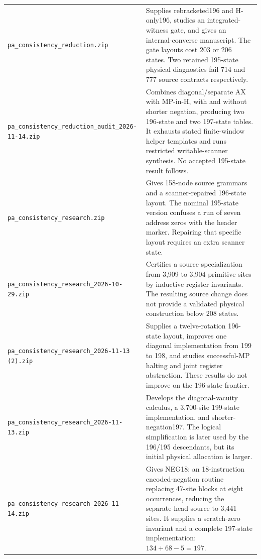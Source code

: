 \begin{longtable}{@{}>{\raggedright\arraybackslash}p{}@{\hspace{.035\textwidth}}>{\raggedright\arraybackslash}p{}@{}}
\nolinkurl{pa_consistency_reduction.zip}
& Supplies rebracketed196 and H-only196, studies an integrated-witness gate,
and gives an internal-converse manuscript. The gate layouts cost 203 or 206
states. Two retained 195-state physical diagnostics fail 714 and 777 source
contracts respectively.\\[.7ex]

\nolinkurl{pa_consistency_reduction_audit_2026-11-14.zip}
& Combines diagonal/separate AX with MP-in-H, with and without shorter
negation, producing two 196-state and two 197-state tables. It exhausts stated
finite-window helper templates and runs restricted writable-scanner synthesis.
No accepted 195-state result follows.\\[.7ex]

\nolinkurl{pa_consistency_research.zip}
& Gives 158-node source grammars and a scanner-repaired 196-state layout.
The nominal 195-state version confuses a run of seven address zeros with the
header marker. Repairing that specific layout requires an extra scanner state.\\[.7ex]

\nolinkurl{pa_consistency_research_2026-10-29.zip}
& Certifies a source specialization from 3,909 to 3,904 primitive sites by
inductive register invariants. The resulting source change does not provide a
validated physical construction below 208 states.\\[.7ex]

\nolinkurl{pa_consistency_research_2026-11-13 (2).zip}
& Supplies a twelve-rotation 196-state layout, improves one diagonal
implementation from 199 to 198, and studies successful-MP halting and joint
register abstraction. These results do not improve on the 196-state frontier.\\[.7ex]

\nolinkurl{pa_consistency_research_2026-11-13.zip}
& Develops the diagonal-vacuity calculus, a 3,700-site 199-state implementation,
and shorter-negation197. The logical simplification is later used by the
196/195 descendants, but its initial physical allocation is larger.\\[.7ex]

\nolinkurl{pa_consistency_research_2026-11-14.zip}
& Gives NEG18: an 18-instruction encoded-negation routine replacing 47-site
blocks at eight occurrences, reducing the separate-head source to 3,441 sites.
It supplies a scratch-zero invariant and a complete 197-state implementation:
$134+68-5=197$.\\[.7ex]


\end{longtable}
